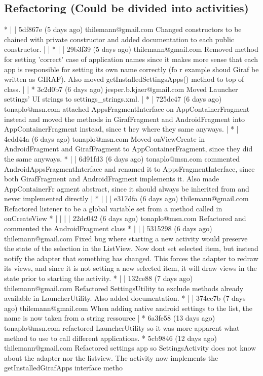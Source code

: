 \subsection{Refactoring (Could be divided into activities)}
* | | 5df867e (5 days ago) thilemann@gmail.com Changed constructors to be chained with private constructor and added documentation to each public constructor.
| | * | | 29b3f39 (5 days ago) thilemann@gmail.com Removed method for setting 'correct' case of application names since it makes more sense that each app is responsible for setting its own name correctly (fo
r example shoud Giraf be written as GIRAF). Also moved getInstalledSettingsApps() method to top of class.
| | * 3c2d0b7 (6 days ago) jesper.b.kjaer@gmail.com Moved Launcher settings' UI strings to settings\_strings.xml.
| * | 725dc47 (6 days ago) tonaplo@msn.com attached AppsFragmentInterface on AppContainerFragment instead and moved the methods in GirafFragment and AndroidFragment into AppContainerFragment instead, since t
hey where they same anyways.
| * | 4edd44a (6 days ago) tonaplo@msn.com Moved onViewCreate in AndroidFragment and GirafFragment to AppContainerFragment, since they did the same anyways.
* | | 6d91fd3 (6 days ago) tonaplo@msn.com commented AndroidAppsFragmentInterface and renamed it to AppsFragmentInterface, since both GirafFragment and AndroidFragment implements it. Also made AppContainerFr
agment abstract, since it should always be inherited from and never implemented directly
| * | | | e317dfa (6 days ago) thilemann@gmail.com Refactored listener to be a global variable set from a method called in onCreateView
* | | | | 22dc042 (6 days ago) tonaplo@msn.com Refactored and commented the AndroidFragment class
* | | | 5315298 (6 days ago) thilemann@gmail.com Fixed bug where starting a new activity would preserve the state of the selection in the ListView. Now dont set selected item, but instead notify the adapter
that something has changed. This forces the adapter to redraw its views, and since it is not setting a new selected item, it will draw views in the state prior to starting the activity.
* | | 132ce88 (7 days ago) thilemann@gmail.com Refactored SettingsUtility to exclude methods already available in LauncherUtility. Also added documentation.
* | | 374cc7b (7 days ago) thilemann@gmail.com When adding native android settings to the list, the name is now taken from a string ressource
| * 6a3fe58 (13 days ago) tonaplo@msn.com refactored LauncherUtility so it was more apparent what method to use to call different applications.
* 5cb9846 (12 days ago) thilemann@gmail.com Refactored settings app so SettingsActivity does not know about the adapter nor the listview. The activity now implements the getInstalledGirafApps interface metho

